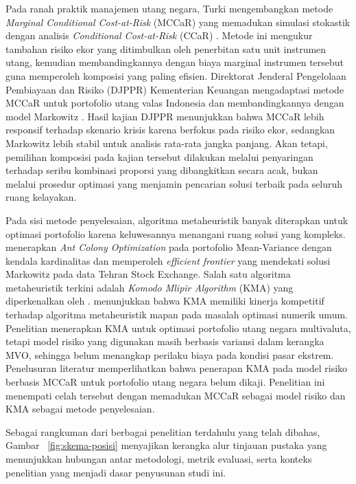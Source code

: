 Pada ranah praktik manajemen utang negara, Turki mengembangkan metode \textit{Marginal Conditional Cost-at-Risk} (MCCaR) yang memadukan simulasi stokastik dengan analisis \textit{Conditional Cost-at-Risk} (CCaR) . Metode ini mengukur tambahan risiko ekor yang ditimbulkan oleh penerbitan satu unit instrumen utang, kemudian membandingkannya dengan biaya marginal instrumen tersebut guna memperoleh komposisi yang paling efisien. Direktorat Jenderal Pengelolaan Pembiayaan dan Risiko (DJPPR) Kementerian Keuangan mengadaptasi metode MCCaR untuk portofolio utang valas Indonesia dan membandingkannya dengan model Markowitz . Hasil kajian DJPPR menunjukkan bahwa MCCaR lebih responsif terhadap skenario krisis karena berfokus pada risiko ekor, sedangkan Markowitz lebih stabil untuk analisis rata-rata jangka panjang. Akan tetapi, pemilihan komposisi pada kajian tersebut dilakukan melalui penyaringan terhadap seribu kombinasi proporsi yang dibangkitkan secara acak, bukan melalui prosedur optimasi yang menjamin pencarian solusi terbaik pada seluruh ruang kelayakan.

Pada sisi metode penyelesaian, algoritma metaheuristik banyak diterapkan untuk optimasi portofolio karena keluwesannya menangani ruang solusi yang kompleks.  menerapkan \textit{Ant Colony Optimization} pada portofolio Mean-Variance dengan kendala kardinalitas dan memperoleh \textit{efficient frontier} yang mendekati solusi Markowitz pada data Tehran Stock Exchange. Salah satu algoritma metaheuristik terkini adalah \textit{Komodo Mlipir Algorithm} (KMA) yang diperkenalkan oleh .  menunjukkan bahwa KMA memiliki kinerja kompetitif terhadap algoritma metaheuristik mapan pada masalah optimasi numerik umum. Penelitian  menerapkan KMA untuk optimasi portofolio utang negara multivaluta, tetapi model risiko yang digunakan masih berbasis variansi dalam kerangka MVO, sehingga belum menangkap perilaku biaya pada kondisi pasar ekstrem. Penelusuran literatur memperlihatkan bahwa penerapan KMA pada model risiko berbasis MCCaR untuk portofolio utang negara belum dikaji. Penelitian ini menempati celah tersebut dengan memadukan MCCaR sebagai model risiko dan KMA sebagai metode penyelesaian.

Sebagai rangkuman dari berbagai penelitian terdahulu yang telah dibahas, Gambar ~\ref{fig:skema-posisi} menyajikan kerangka alur tinjauan pustaka yang menunjukkan hubungan antar metodologi, metrik evaluasi, serta konteks penelitian yang menjadi dasar penyusunan studi ini.

